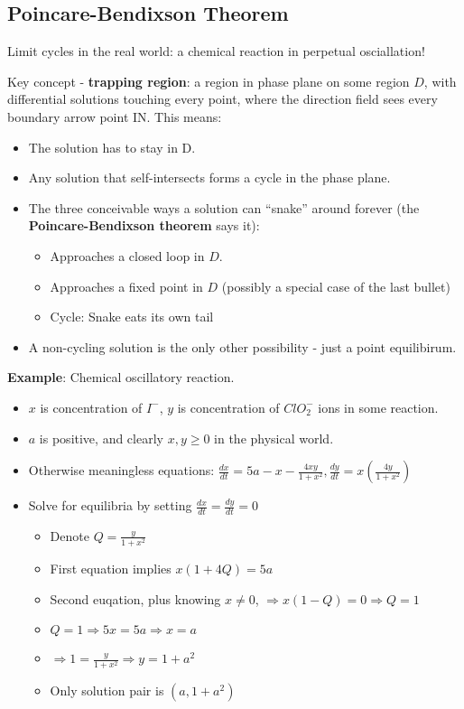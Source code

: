 \documentclass[11pt, oneside]{article}   	%
\begin{document}
\subsection{Poincare-Bendixson Theorem}

Limit cycles in the real world: a chemical reaction in perpetual osciallation!

Key concept - \textbf{trapping region}: a region in phase plane on some region $D$, with differential solutions touching every point, where the direction field sees every boundary arrow point IN.  This means:
\begin{itemize}
\item The solution has to stay in D.
\item Any solution that self-intersects forms a cycle in the phase plane.
\item The three conceivable ways a solution can ``snake'' around forever (the \textbf{Poincare-Bendixson theorem} says it):
\begin{itemize}
\item Approaches a closed loop in $D$.
\item Approaches a fixed point in $D$ (possibly a special case of the last bullet)
\item Cycle: Snake eats its own tail
\end{itemize}
\item A non-cycling solution is the only other possibility - just a point equilibirum.
\end{itemize}

\textbf{Example}: Chemical oscillatory reaction.
\begin{itemize}
\item $x$ is concentration of $I^-$, $y$ is concentration of $ClO_2^-$ ions in some reaction.
\item $a$ is positive, and clearly $x, y \geq 0$ in the physical world.
\item Otherwise meaningless equations: $\frac{dx}{dt} = 5a - x - \frac{4xy}{1+x^2}, \frac{dy}{dt} = x(\frac{4y}{1+x^2})$
\item Solve for equilibria by setting $\frac{dx}{dt} = \frac{dy}{dt} = 0$
\begin{itemize}
\item Denote $Q = \frac{y}{1+x^2}$
\item First equation implies $x(1+4Q) = 5a$
\item Second euqation, plus knowing $x \neq 0$, $\Rightarrow x(1-Q) = 0 \Rightarrow Q = 1$
\item $Q = 1 \Rightarrow 5x = 5a \Rightarrow x = a$
\item $\Rightarrow 1 = \frac{y}{1+x^2} \Rightarrow y = 1+a^2$
\item Only solution pair is $(a, 1+a^2)$
\end{itemize}
\end{itemize}
\end{document}
